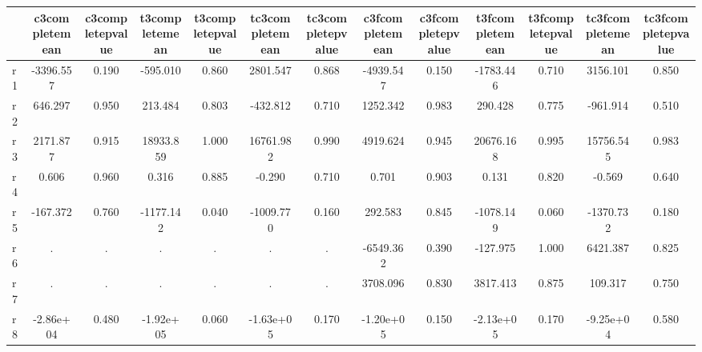 \begin{table}[htbp]
\begin{tabular}{lcccccccccccc} \hline \hline
 & c3completemean  & c3completepvalue  & t3completemean  & t3completepvalue  & tc3completemean  & tc3completepvalue  & c3fcompletemean  & c3fcompletepvalue  & t3fcompletemean  & t3fcompletepvalue  & tc3fcompletemean  & tc3fcompletepvalue  \\  \hline 
r1 & -3396.557 &     0.190 &  -595.010 &     0.860 &  2801.547 &     0.868 & -4939.547 &     0.150 & -1783.446 &     0.710 &  3156.101 &     0.850 \\  
r2 &   646.297 &     0.950 &   213.484 &     0.803 &  -432.812 &     0.710 &  1252.342 &     0.983 &   290.428 &     0.775 &  -961.914 &     0.510 \\  
r3 &  2171.877 &     0.915 & 18933.859 &     1.000 & 16761.982 &     0.990 &  4919.624 &     0.945 & 20676.168 &     0.995 & 15756.545 &     0.983 \\  
r4 &     0.606 &     0.960 &     0.316 &     0.885 &    -0.290 &     0.710 &     0.701 &     0.903 &     0.131 &     0.820 &    -0.569 &     0.640 \\  
r5 &  -167.372 &     0.760 & -1177.142 &     0.040 & -1009.770 &     0.160 &   292.583 &     0.845 & -1078.149 &     0.060 & -1370.732 &     0.180 \\  
r6 &         . &         . &         . &         . &         . &         . & -6549.362 &     0.390 &  -127.975 &     1.000 &  6421.387 &     0.825 \\  
r7 &         . &         . &         . &         . &         . &         . &  3708.096 &     0.830 &  3817.413 &     0.875 &   109.317 &     0.750 \\  
r8 & -2.86e+04 &     0.480 & -1.92e+05 &     0.060 & -1.63e+05 &     0.170 & -1.20e+05 &     0.150 & -2.13e+05 &     0.170 & -9.25e+04 &     0.580 \\  
\hline \hline \end{tabular}
\end{table}

